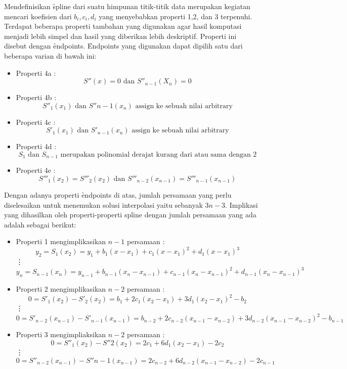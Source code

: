 Mendefinisikan \f{spline} dari suatu himpunan titik-titik data merupakan kegiatan mencari koefisien dari $b_i, c_i, d_i$ yang menyebabkan properti 1,2, dan 3 terpenuhi. Terdapat beberapa properti tambahan yang digunakan agar hasil komputasi menjadi lebih simpel dan hasil yang diberikan lebih deskriptif. Properti ini disebut dengan \f{endpoints}. \f{Endpoints} yang digunakan dapat dipilih satu dari beberapa varian di bawah ini:
\begin{itemize}
	\item Properti 4a  : \[ S''(x) = 0 \text{  dan  } S''_{n-1}(X_n) = 0\]
	\item Properti 4b  : \[ S''_{1}(x_1) \text{  dan  }  S''{n-1}(x_n) \text{ assign ke sebuah nilai arbitrary}\]
	\item Properti 4c  : \[ S'_{1}(x_1) \text{  dan  } S'_{n-1}(x_n) \text{  assign ke sebuah nilai arbitrary}\]
	\item Properti 4d  : \[  S_{1} \text{ dan } S_{n-1} \text{ merupakan polinomial derajat kurang dari atau sama dengan 2}\]
	\item Properti 4e  :\[ S'''_{1}(x_2) = S'''_{2}(x_2) \text{  dan  } S'''_{n-2}(x_{n-1}) = S'''_{n-1}(x_{n-1}) \]
\end{itemize}

Dengan adanya properti \f{endpoints} di atas, jumlah persamaan yang perlu diselesaikan untuk menemukan solusi interpolasi yaitu sebanyak $3n-3$.
Implikasi yang dihasilkan oleh properti-properti spline dengan jumlah persamaan yang ada adalah sebagai berikut:
\begin{itemize}
	\item Properti 1 mengimplikasikan \(n-1\) persamaan : \[ y_2 = S_{1}(x_2) = y_1 + b_1(x - x_1) + c_1(x - x_1)^2 + d_1(x - x_1)^3 \]  \vdots \begin{equation} \label{eq:2.1} y_n =  S_{n-1}(x_n) = y_{n-1} + b_{n-1}(x_n - x_{n-1}) + c_{n-1}(x_n - x_{n-1})^2 + d_{n-1}(x_n - x_{n-1})^3 \end{equation}
	\item Properti 2 mengimplikasikan \(n-2\) persamaan : \[ 0 = S'_{1}(x_2) - S'_{2}(x_2) = b_1 + 2c_1(x_2 - x_1) + 3d_1(x_2 - x_1)^2 - b_2 \] \vdots \begin{equation} \label{eq:2.2}  0 = S'_{n-2}(x_{n-1}) - S'_{n-1}(x_{n-1}) = b_{n-2} + 2c_{n-2}(x_{n-1} - x_{n-2}) + 3d_{n-2}(x_{n-1} - x_{n-2})^2 - b_{n-1}  \end{equation}
	\item Properti 3 mengimpliaksikan \(n-2\) persamaan : \[ 0 = S''_{1}(x_2) - S''{2}(x_2) = 2c_1 + 6d_1(x_2 - x_1) - 2c_2 \] \vdots \begin{equation} \label{eq:2.3}  0 = S''_{n-2}(x_{n-1}) - S''{n-1}(x_{n-1}) = 2c_{n-2} + 6d_{n-2}(x_{n-1} - x_{n-2}) - 2c_{n-1}  \end{equation}
\end{itemize}

